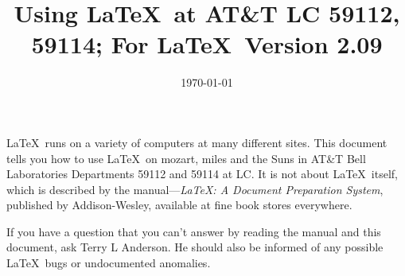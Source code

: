 %
%


\newcommand{\contact}{Terry L Anderson}

\newcommand{\BibTeX}{{\rm B\kern-.05em{\sc i\kern-.025em b}\kern-.08em
    T\kern-.1667em\lower.7ex\hbox{E}\kern-.125emX}}

\newcommand{\SLiTeX}{{\rm S\kern-.06em{\sc l\kern-.035emi}\kern-.06em T\kern
   -.1667em\lower.7ex\hbox{E}\kern-.125emX}}


\newcommand\bs{\char '134 }  %


\pagestyle{headandfoot}
\markproprietary
\title{Using \LaTeX\ at AT\&T LC 59112, 59114; For \LaTeX\ Version 2.09}
\date{\today}
\keywords{}


\makehead

\LaTeX\ runs on a variety of computers at many different sites.  This
document tells you how to use \LaTeX\ on mozart, miles and the Suns 
in AT\&T Bell Laboratories Departments 59112 and 59114 at LC. It is
not about \LaTeX\ itself, which is described by 
the manual---{\em \LaTeX: A Document Preparation System}, published by
Addison-Wesley, available at fine book stores everywhere\cite{bib:latex}.

If you have a question that you can't answer by reading the manual and
this document, ask \contact.  He should also be informed of any
possible \LaTeX\ bugs or undocumented anomalies.


